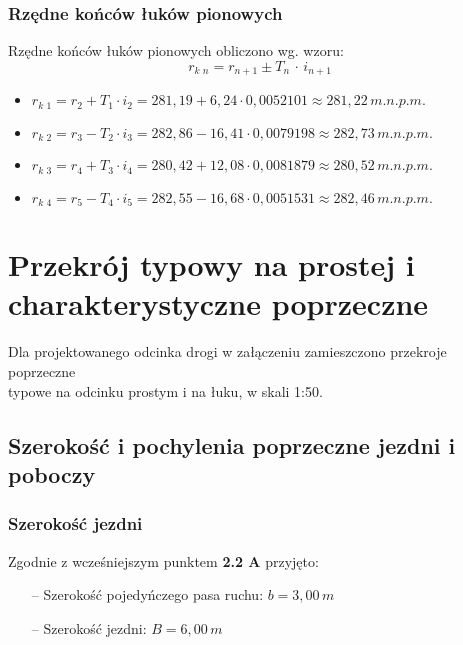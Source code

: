 \documentclass[12pt]{article}
\begin{document}
    \subsubsection{Rzędne końców łuków pionowych}
        Rzędne końców łuków pionowych obliczono wg. wzoru:
        \begin{equation}
            r_{k\,\,n} = r_{n+1} \pm T_{n} \,\cdot\, i_{n+1}
        \end{equation}

        \begin{itemize}
            \item \( r_{k\,\,1} = r_{2} + T_{1} \cdot i_{2} = 281,19 + 6,24 \cdot 0,0052101 \approx 281,22\,m.n.p.m. \)
            \item \( r_{k\,\,2} = r_{3} - T_{2} \cdot i_{3} = 282,86 - 16,41 \cdot 0,0079198 \approx 282,73\,m.n.p.m. \)
            \item \( r_{k\,\,3} = r_{4} + T_{3} \cdot i_{4} = 280,42 + 12,08 \cdot 0,0081879 \approx 280,52\,m.n.p.m. \)
            \item \( r_{k\,\,4} = r_{5} - T_{4} \cdot i_{5} = 282,55 - 16,68 \cdot 0,0051531 \approx 282,46\,m.n.p.m. \)
        \end{itemize}
        \newpage
\section{Przekrój typowy na prostej i charakterystyczne poprzeczne}
        Dla projektowanego odcinka drogi w załączeniu zamieszczono przekroje
        poprzeczne\\ typowe na odcinku prostym i na łuku, w skali 1:50.

    \subsection{Szerokość i pochylenia poprzeczne jezdni i poboczy}
        \subsubsection{Szerokość jezdni}
        Zgodnie z wcześniejszym punktem \textbf{2.2 A} przyjęto:
        \begin{itemize}
            \item[--] Szerokość pojedyńczego pasa ruchu: \( b = 3,00\,m \)
            \item[--] Szerokość jezdni: \( B = 6,00\,m \) 
        \end{itemize}
\end{document}
